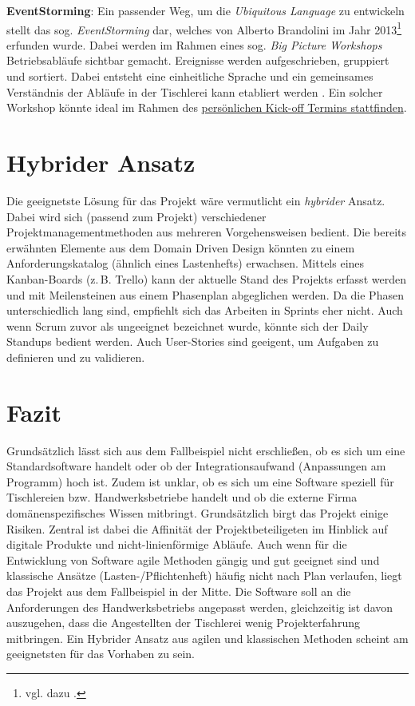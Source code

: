 \documentclass[
    a4paper,
    11pt,
    bibliography=totoc,
    listof=totoc,
    parskip=half,
    headings=normal
]{scrbook}
\begin{document}
\textbf{EventStorming}: Ein passender Weg, um die \textit{Ubiquitous Language} zu entwickeln stellt das sog.
\textit{EventStorming} dar, welches von Alberto Brandolini im Jahr 2013\footnote{vgl. dazu \citeauthor{Brandolini2025}.} erfunden wurde. Dabei werden im Rahmen eines sog. \textit{Big Picture Workshops} Betriebsabläufe sichtbar gemacht. Ereignisse werden aufgeschrieben, gruppiert und sortiert. Dabei entsteht eine einheitliche Sprache und ein gemeinsames Verständnis der Abläufe in der Tischlerei kann etabliert werden \autocite[vgl.][Da Brandolinis Buch erst zu 70~\% (Stand August 2021) fertiggestellt ist, wird auf eine Zusammenfassung der Vorversion zurückgegriffen]{Kejeiri2020}. Ein solcher Workshop könnte ideal im Rahmen des \hyperref[sec:Projektstart]{persönlichen Kick-off Termins stattfinden}.

\section{Hybrider Ansatz}
Die geeignetste Lösung für das Projekt wäre vermutlicht ein \textit{hybrider} Ansatz. Dabei wird sich (passend zum Projekt) verschiedener Projektmanagementmethoden aus mehreren Vorgehensweisen bedient. Die bereits erwähnten Elemente aus dem Domain Driven Design könnten zu einem Anforderungskatalog (ähnlich eines Lastenhefts) erwachsen. Mittels eines Kanban-Boards (z.\,B. Trello) kann der aktuelle Stand des Projekts erfasst werden und mit Meilensteinen aus einem Phasenplan abgeglichen werden. Da die Phasen unterschiedlich lang sind, empfiehlt sich das Arbeiten in Sprints eher nicht. Auch wenn Scrum zuvor als ungeeignet bezeichnet wurde, könnte sich der Daily Standups bedient werden. Auch User-Stories sind geeigent, um Aufgaben zu definieren und zu validieren.

\section{Fazit}
Grundsätzlich lässt sich aus dem Fallbeispiel nicht erschließen, ob es sich um eine Standardsoftware handelt oder ob der Integrationsaufwand (Anpassungen am Programm) hoch ist. Zudem ist unklar, ob es sich um eine Software speziell für Tischlereien bzw. Handwerksbetriebe handelt und ob die externe Firma domänenspezifisches Wissen mitbringt. Grundsätzlich birgt das Projekt einige Risiken. Zentral ist dabei die Affinität der Projektbeteiligeten im Hinblick auf digitale Produkte und nicht-linienförmige Abläufe. Auch wenn für die Entwicklung von Software agile Methoden gängig und gut geeignet sind und klassische Ansätze (Lasten-/Pflichtenheft) häufig nicht nach Plan verlaufen, liegt das Projekt aus dem Fallbeispiel in der Mitte. Die Software soll an die Anforderungen des Handwerksbetriebs angepasst werden, gleichzeitig ist davon auszugehen, dass die Angestellten der Tischlerei wenig Projekterfahrung mitbringen. Ein Hybrider Ansatz aus agilen und klassischen Methoden scheint am geeignetsten für das Vorhaben zu sein.


\backmatter
\printbibliography[title={Literaturverzeichnis}]
\end{document}
